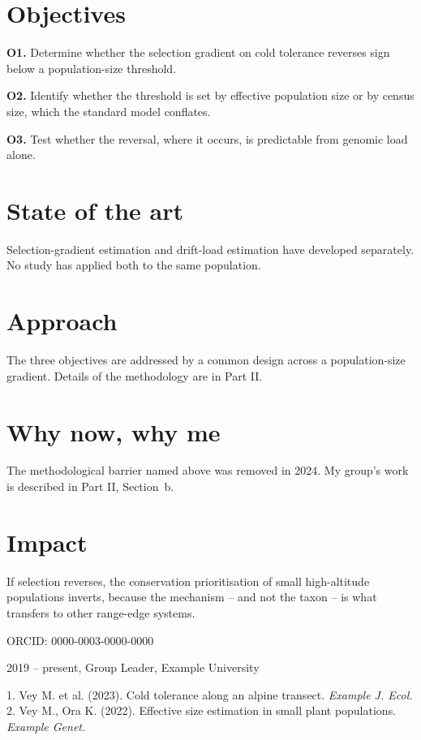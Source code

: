 \documentclass[11pt,a4paper]{article}
\begin{document}
\section{Objectives}
\textbf{O1.} Determine whether the selection gradient on cold tolerance reverses sign
below a population-size threshold.

\textbf{O2.} Identify whether the threshold is set by effective population size or by
census size, which the standard model conflates.

\textbf{O3.} Test whether the reversal, where it occurs, is predictable from genomic
load alone.

\section{State of the art}
Selection-gradient estimation and drift-load estimation have developed separately. No
study has applied both to the same population.

\section{Approach}
The three objectives are addressed by a common design across a population-size
gradient. Details of the methodology are in Part II.

\section{Why now, why me}
The methodological barrier named above was removed in 2024. My group's work is
described in Part II, Section~b.

\section{Impact}
If selection reverses, the conservation prioritisation of small high-altitude
populations inverts, because the mechanism -- and not the taxon -- is what transfers to
other range-edge systems.

\startsectionb

ORCID: 0000-0003-0000-0000

2019 -- present, Group Leader, Example University

1. Vey M. et al. (2023). Cold tolerance along an alpine transect. \emph{Example J.
Ecol.}
2. Vey M., Ora K. (2022). Effective size estimation in small plant populations.
\emph{Example Genet.}
\end{document}
